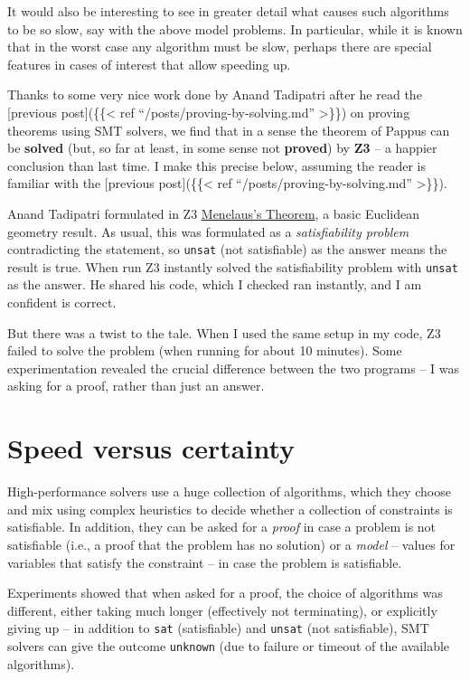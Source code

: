 \documentclass{amsart}
\theoremstyle{plain}
\theoremstyle{definition}
\theoremstyle{remark}
\begin{document}
It would also be interesting to see in greater detail what causes such
algorithms to be so slow, say with the above model problems. In
particular, while it is known that in the worst case any algorithm must
be slow, perhaps there are special features in cases of interest that
allow speeding up.

Thanks to some very nice work done by Anand Tadipatri after he read the
{[}previous post{]}(\{\{\textless{} ref ``/posts/proving-by-solving.md''
\textgreater{}\}\}) on proving theorems using SMT solvers, we find that
in a sense the theorem of Pappus can be \textbf{solved} (but, so far at
least, in some sense not \textbf{proved}) by \textbf{Z3} -- a happier
conclusion than last time. I make this precise below, assuming the
reader is familiar with the {[}previous post{]}(\{\{\textless{} ref
``/posts/proving-by-solving.md'' \textgreater{}\}\}).

Anand Tadipatri formulated in Z3
\href{https://en.wikipedia.org/wiki/Menelaus\%27s_theorem}{Menelaus's
	Theorem}, a basic Euclidean geometry result. As usual, this was
formulated as a \emph{satisfiability problem} contradicting the
statement, so \texttt{unsat} (not satisfiable) as the answer means the
result is true. When run Z3 instantly solved the satisfiability problem
with \texttt{unsat} as the answer. He shared his code, which I checked
ran instantly, and I am confident is correct.

But there was a twist to the tale. When I used the same setup in my
code, Z3 failed to solve the problem (when running for about 10
minutes). Some experimentation revealed the crucial difference between
the two programs -- I was asking for a proof, rather than just an
answer.

\hypertarget{speed-versus-certainty}{%
	\section{Speed versus certainty}\label{speed-versus-certainty}}

High-performance solvers use a huge collection of algorithms, which they
choose and mix using complex heuristics to decide whether a collection
of constraints is satisfiable. In addition, they can be asked for a
\emph{proof} in case a problem is not satisfiable (i.e., a proof that
the problem has no solution) or a \emph{model} -- values for variables
that satisfy the constraint -- in case the problem is satisfiable.

Experiments showed that when asked for a proof, the choice of algorithms
was different, either taking much longer (effectively not terminating),
or explicitly giving up -- in addition to \texttt{sat} (satisfiable) and
\texttt{unsat} (not satisfiable), SMT solvers can give the outcome
\texttt{unknown} (due to failure or timeout of the available
algorithms).
\end{document}
